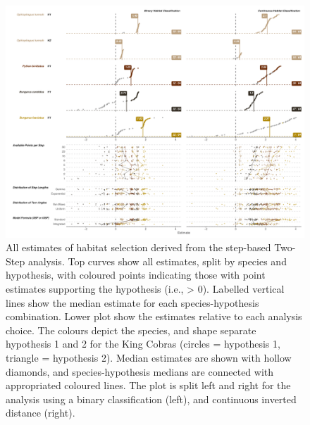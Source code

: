 \documentclass[10pt,a4paper]{article}
\begin{document}
\begin{figure}
\includegraphics[width=1\linewidth]{../../figures/specCurve_twoStep} \caption{All estimates of habitat selection derived from the step-based Two-Step analysis. Top curves show all estimates, split by species and hypothesis, with coloured points indicating those with point estimates supporting the hypothesis (i.e., > 0). Labelled vertical lines show the median estimate for each species-hypothesis combination. Lower plot show the estimates relative to each analysis choice. The colours depict the species, and shape separate hypothesis 1 and 2 for the King Cobras (circles = hypothesis 1, triangle = hypothesis 2). Median estimates are shown with hollow diamonds, and species-hypothesis medians are connected with appropriated coloured lines. The plot is split left and right for the analysis using a binary classification (left), and continuous inverted distance (right).}\label{fig:specCurveTwoStep}
\end{figure}
\end{document}
